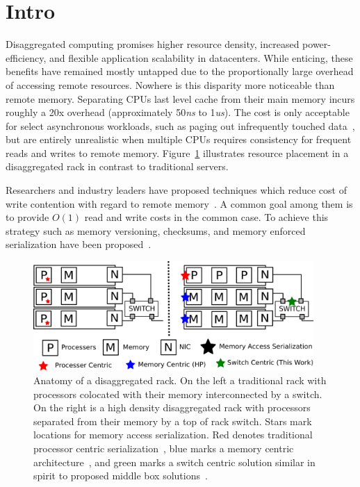 \section{Intro}
\label{sec:intro}

Disaggregated computing promises higher resource density, increased
power-efficiency, and flexible application scalability in datacenters.
While enticing, these benefits have remained mostly untapped due to the proportionally large
overhead of accessing remote resources. Nowhere is this disparity more
noticeable than remote memory. Separating CPUs last level cache from
their main memory incurs roughly a 20x overhead (approximately
50\textit{ns} to 1\textit{us}).  The cost is only acceptable for
select asynchronous workloads, such as paging out infrequently touched
data~\cite{gms}, but are entirely unrealistic when multiple CPUs
requires consistency for frequent reads and writes to remote memory.
Figure~\ref{fig:overview} illustrates resource placement in a
disaggregated rack in contrast to traditional servers.

Researchers and industry leaders have proposed techniques which reduce
cost of write contention with regard to remote
memory~\cite{aguilera2019designing,cell,sonuma,storm,clover}. A common
goal among them is to provide $O(1)$ read and write costs in the
common case. To achieve this strategy such as memory versioning,
checksums, and memory enforced serialization have been
proposed~\cite{aguilera2019designing}.





\begin{figure}
      \centering
      \includegraphics[width=0.95\textwidth]{fig/overview.png}
      \caption{Anatomy of a disaggregated rack. On the left a
      traditional rack with processors colocated with their memory
      interconnected by a switch. On the right is a high density
      disaggregated rack with processors separated from their memory
      by a top of rack switch. Stars mark locations for memory access
      serialization. Red denotes traditional processor centric
      serialization~\cite{ memc3, cell, sonuma, storm, clover}, blue marks a
      memory centric architecture~\cite{aguilera2019designing}, and
      green marks a switch centric solution similar in spirit to
      proposed middle box solutions~\cite{254120}.
      \label{fig:overview}
      }
\end{figure}


